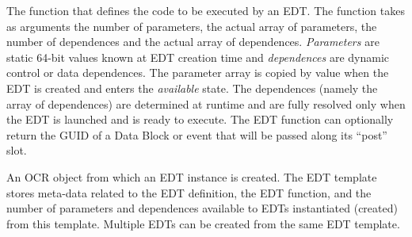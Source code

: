 %
%
\glossarydefstart
The function that defines the code to be executed by an EDT. The function
takes as arguments the number of parameters, the actual array of
parameters, the number of dependences and the actual array of
dependences. \emph{Parameters} are static 64-bit values known at EDT
creation time and \emph{dependences} are dynamic control or data
dependences. The parameter array is copied by value when the EDT is
created and enters the \emph{available} state. The dependences (namely the array of dependences) are
determined at runtime and are fully resolved only when the EDT is launched and 
is ready to execute. The EDT function can optionally return the GUID of a Data Block or
event that will be passed along its ``post'' slot.

\glossarydefend
{}
\glossarydefstart
An OCR object from which an EDT instance is created. The EDT template
stores meta-data related to the EDT definition, the EDT function, and
the number of parameters and dependences available to EDTs
instantiated (created) from this template. Multiple EDTs can be created from the
same EDT template.
\glossarydefend


